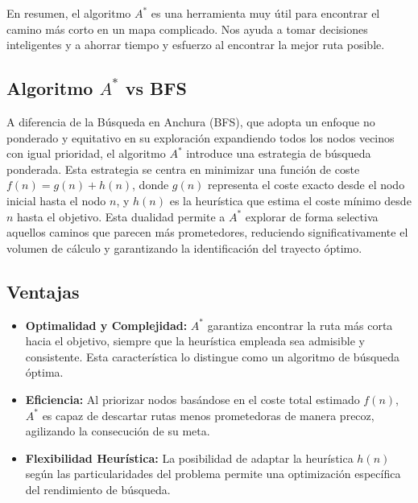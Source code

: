 En resumen, el algoritmo \(A^*\) es una herramienta muy útil para encontrar el camino más corto en un mapa complicado. 
Nos ayuda a tomar decisiones inteligentes y a ahorrar tiempo y esfuerzo al encontrar la mejor ruta posible.
\subsection*{Algoritmo $A^{*}$ vs BFS}

A diferencia de la Búsqueda en Anchura (BFS), que adopta un enfoque no ponderado y equitativo en su 
exploración expandiendo todos los nodos vecinos con igual prioridad, el algoritmo $A^{*}$ introduce 
una estrategia de búsqueda ponderada. Esta estrategia se centra en minimizar una función de coste 
\(f(n) = g(n) + h(n)\), donde \(g(n)\) representa el coste exacto desde el nodo inicial hasta el nodo 
\(n\), y \(h(n)\) es la heurística que estima el coste mínimo desde \(n\) hasta el objetivo. Esta 
dualidad permite a $A^{*}$ explorar de forma selectiva aquellos caminos que parecen más prometedores, 
reduciendo significativamente el volumen de cálculo y garantizando la identificación del trayecto óptimo.

\subsection*{Ventajas}
\begin{itemize}
    \item \textbf{Optimalidad y Complejidad:} $A^{*}$ garantiza encontrar la ruta más corta hacia el 
                objetivo, siempre que la heurística empleada sea admisible y consistente. Esta 
                característica lo distingue como un algoritmo de búsqueda óptima.
    \item \textbf{Eficiencia:} Al priorizar nodos basándose en el coste total estimado \(f(n)\), $A^{*}$ 
                es capaz de descartar rutas menos prometedoras de manera precoz, agilizando la 
                consecución de su meta.
    \item \textbf{Flexibilidad Heurística:} La posibilidad de adaptar la heurística \(h(n)\) según 
                las particularidades del problema permite una optimización específica del 
                rendimiento de búsqueda.
\end{itemize}
